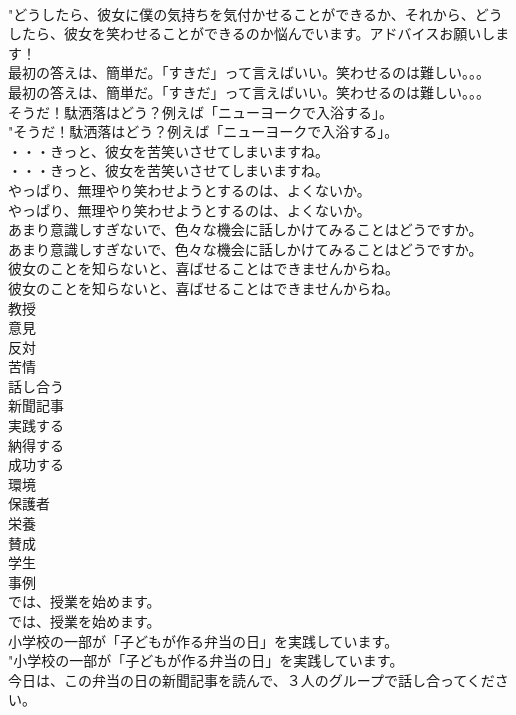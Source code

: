 \documentclass[8pt]{extreport}
\begin{document}
\begin{CJK}{UTF8}{min}
\\	"どうしたら、彼女に僕の気持ちを気付かせることができるか、それから、どうしたら、彼女を笑わせることができるのか悩んでいます。アドバイスお願いします！ 
\\	最初の答えは、簡単だ。「すきだ」って言えばいい。笑わせるのは難しい。。。	
\\	最初の答えは、簡単だ。「すきだ」って言えばいい。笑わせるのは難しい。。。 
\\	そうだ！駄洒落はどう？例えば「ニューヨークで入浴する」。	
\\	"そうだ！駄洒落はどう？例えば「ニューヨークで入浴する」。 
\\	・・・きっと、彼女を苦笑いさせてしまいますね。	
\\	・・・きっと、彼女を苦笑いさせてしまいますね。 
\\	やっぱり、無理やり笑わせようとするのは、よくないか。	
\\	やっぱり、無理やり笑わせようとするのは、よくないか。 
\\	あまり意識しすぎないで、色々な機会に話しかけてみることはどうですか。	
\\	あまり意識しすぎないで、色々な機会に話しかけてみることはどうですか。 
\\	彼女のことを知らないと、喜ばせることはできませんからね。	
\\	彼女のことを知らないと、喜ばせることはできませんからね。 
\\	教授
\\	意見
\\	反対
\\	苦情
\\	話し合う
\\	新聞記事
\\	実践する
\\	納得する
\\	成功する
\\	環境
\\	保護者
\\	栄養
\\	賛成
\\	学生
\\	事例
\\	では、授業を始めます。	
\\	では、授業を始めます。 
\\	小学校の一部が「子どもが作る弁当の日」を実践しています。	
\\	"小学校の一部が「子どもが作る弁当の日」を実践しています。 
\\	今日は、この弁当の日の新聞記事を読んで、３人のグループで話し合ってください。	

\end{CJK}
\end{document}
